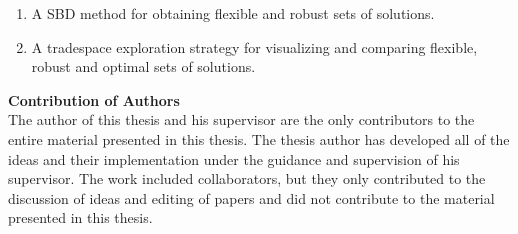 \documentclass[12pt,Bold,letterpaper,TexShade,twoside]{mcgilletdclass}
\begin{document}
\begin{romanPagenumber}{2}
{\begin{enumerate}
\begin{enumerate}
		\item{A \acl{SBD} method for obtaining flexible and robust sets of solutions.}
		\item{A tradespace exploration strategy for visualizing and comparing flexible, robust and optimal sets of solutions.}
	\end{enumerate}
\end{enumerate}
%
\textbf{Contribution of Authors}\\
%
The author of this thesis and his supervisor are the only contributors to the entire material presented in this thesis. The thesis author has developed all of the ideas and their implementation under the guidance and supervision of his supervisor. The work included collaborators, but they only contributed to the discussion of ideas and editing of papers and did not contribute to the material presented in this thesis.
}%
\Contribution%


\end{romanPagenumber}
\end{document}
